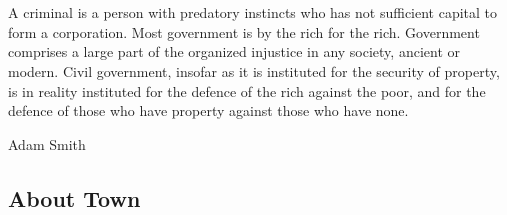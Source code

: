 \chapter{}
\epigraph{A criminal is a person with predatory instincts who has not sufficient capital to form a corporation. Most government is by the rich for the rich.
Government comprises a large part of the organized injustice in any society, ancient or modern.
Civil government, insofar as it is instituted for the security of property, is in reality instituted for the defence of the rich against the poor, and for the defence of those who have property against those who have none.}%
{Adam Smith}

\section{About Town}

\townMap

